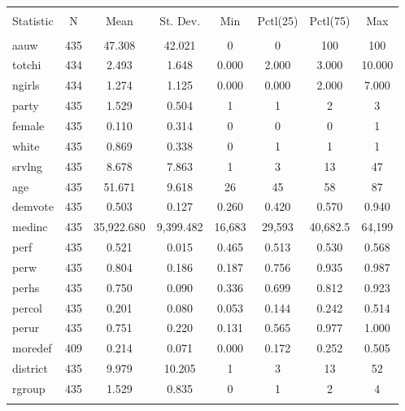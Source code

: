 \documentclass[
]{article}
\begin{document}
\begin{table}[!htbp] \centering 
  \caption{} 
  \label{} 
\begin{tabular}{@{\extracolsep{5pt}}lccccccc} 
\\[-1.8ex]\hline 
\hline \\[-1.8ex] 
Statistic & \multicolumn{1}{c}{N} & \multicolumn{1}{c}{Mean} & \multicolumn{1}{c}{St. Dev.} & \multicolumn{1}{c}{Min} & \multicolumn{1}{c}{Pctl(25)} & \multicolumn{1}{c}{Pctl(75)} & \multicolumn{1}{c}{Max} \\ 
\hline \\[-1.8ex] 
aauw & 435 & 47.308 & 42.021 & 0 & 0 & 100 & 100 \\ 
totchi & 434 & 2.493 & 1.648 & 0.000 & 2.000 & 3.000 & 10.000 \\ 
ngirls & 434 & 1.274 & 1.125 & 0.000 & 0.000 & 2.000 & 7.000 \\ 
party & 435 & 1.529 & 0.504 & 1 & 1 & 2 & 3 \\ 
female & 435 & 0.110 & 0.314 & 0 & 0 & 0 & 1 \\ 
white & 435 & 0.869 & 0.338 & 0 & 1 & 1 & 1 \\ 
srvlng & 435 & 8.678 & 7.863 & 1 & 3 & 13 & 47 \\ 
age & 435 & 51.671 & 9.618 & 26 & 45 & 58 & 87 \\ 
demvote & 435 & 0.503 & 0.127 & 0.260 & 0.420 & 0.570 & 0.940 \\ 
medinc & 435 & 35,922.680 & 9,399.482 & 16,683 & 29,593 & 40,682.5 & 64,199 \\ 
perf & 435 & 0.521 & 0.015 & 0.465 & 0.513 & 0.530 & 0.568 \\ 
perw & 435 & 0.804 & 0.186 & 0.187 & 0.756 & 0.935 & 0.987 \\ 
perhs & 435 & 0.750 & 0.090 & 0.336 & 0.699 & 0.812 & 0.923 \\ 
percol & 435 & 0.201 & 0.080 & 0.053 & 0.144 & 0.242 & 0.514 \\ 
perur & 435 & 0.751 & 0.220 & 0.131 & 0.565 & 0.977 & 1.000 \\ 
moredef & 409 & 0.214 & 0.071 & 0.000 & 0.172 & 0.252 & 0.505 \\ 
district & 435 & 9.979 & 10.205 & 1 & 3 & 13 & 52 \\ 
rgroup & 435 & 1.529 & 0.835 & 0 & 1 & 2 & 4 \\ 
\hline \\[-1.8ex] 
\end{tabular} 
\end{table}
\end{document}

